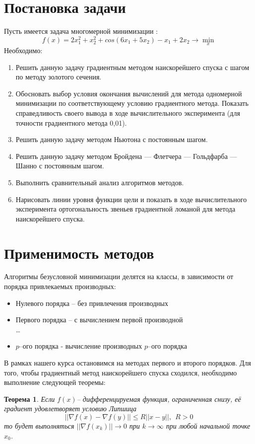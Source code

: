\documentclass{article}
\newtheorem{theorem}{Теорема}
\begin{document}
\section{Постановка задачи}
\noindent Пусть имеется задача многомерной минимизации :
$$f(x)=2x_1^{2}+x_2^{2}+cos(6x_1+5x_2)-x_1+2x_2 \longrightarrow \min_x$$
Необходимо:
\begin{enumerate}
    \item Решить данную задачу градиентным методом наискорейшего спуска с шагом по методу золотого сечения.
    \item Обосновать выбор условия окончания вычислений для метода одномерной минимизации по соответствующему условию градиентного метода. Показать справедливость своего вывода в ходе вычислительного эксперимента (для точности градиентного метода 0,01).
    \item Решить данную задачу методом Ньютона с постоянным шагом.
    \item Решить данную задачу методом Бройдена — Флетчера — Гольдфарба — Шанно с постоянным шагом.
    \item Выполнить сравнительный анализ алгоритмов методов.
    \item Нарисовать линии уровня функции цели и показать в ходе вычислительного эксперимента ортогональность звеньев градиентной ломаной для метода наискорейшего спуска.
\end{enumerate}

\section{Применимость методов}
\noindent Алгоритмы безусловной минимизации делятся на классы, в зависимости от порядка привлекаемых производных:
\begin{itemize}
    \item Нулевого порядка -- без привлечения производных
    \item Первого порядка -- с вычислением первой производной\\
    \dots
    \item $p$--ого порядка - вычисление производных $p$--ого порядка
\end{itemize}
В рамках нашего курса остановимся на методах первого и второго порядков.
Для того, чтобы градиентный метод наискорейшего спуска сходился, необходимо выполнение следующей теоремы:
\begin{theorem}
Если $f(x)$-- дифференцируемая функция, ограниченная снизу, её градиент удовлетворяет условию Липшица
$$||\nabla f(x) - \nabla f(y)|| \le R ||x-y||, ~~R>0$$
то будет выполняться $||\nabla f(x_k)|| \longrightarrow 0$ при $k \rightarrow \infty$  при любой начальной точке $x_0$.
\end{theorem}
\end{document}
